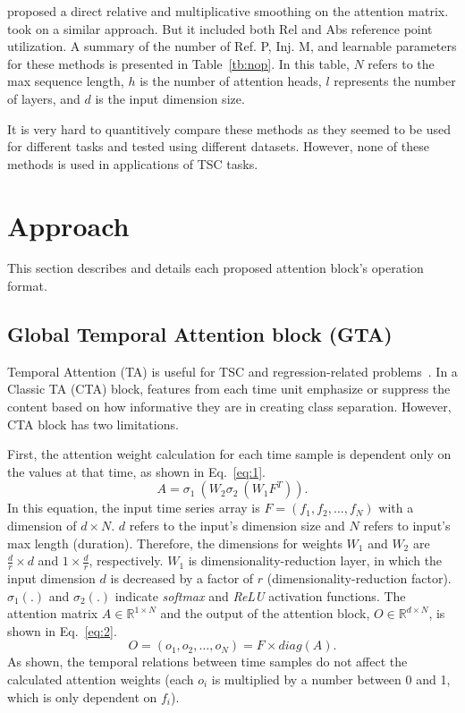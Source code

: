 \documentclass[journal]{IEEEtran}
\begin{document}
\cite{wu_da-transformer_2021} proposed a direct relative and multiplicative smoothing on the attention matrix.~\cite{huang-etal-2020-improve} took on a similar approach. But it included both Rel and Abs reference point utilization. A summary of the number of Ref. P, Inj. M, and learnable parameters for these methods is presented in Table~\ref{tb:nop}. In this table, $N$ refers to the max sequence length, $h$ is the number of attention heads, $l$ represents the number of layers, and $d$ is the input dimension size. 

It is very hard to quantitively compare these methods as they seemed to be used for different tasks and tested using different datasets. However, none of these methods is used in applications of TSC tasks. 

\section{Approach}
This section describes and details each proposed attention block's operation format.
\subsection{Global Temporal Attention block (GTA)}
Temporal Attention (TA) is useful for TSC and regression-related problems~\cite{doughty2019pros, zeng2020hybrid, xu2019learning}. In a Classic TA (CTA) block, features from each time unit emphasize or suppress the content based on how informative they are in creating class separation. However, CTA block has two limitations. 

First, the attention weight calculation for each time sample is dependent only on the values at that time, as shown in Eq.~\eqref{eq:1}.
\begin{equation} \label{eq:1}
A =\sigma_1\ (W_2\sigma_2\ (W_1F^T)).
\end{equation}
In this equation, the input time series array is $F=\left(f_1,f_2,\ldots,f_N\right)$ with a dimension of $d\times N$. $d$ refers to the input's dimension size and $N$ refers to input's max length (duration). Therefore, the dimensions for weights $W_1$ and $W_2$ are $\frac{d}{r}\times d$ and $1\times \frac{d}{r}$, respectively. $W_1$ is dimensionality-reduction layer, in which the input dimension $d$ is decreased by a factor of $r$ (dimensionality-reduction factor).
$ \sigma_1\left(.\right)$ and $ \sigma_2\left(.\right)$ indicate \textit{softmax} and \textit{ReLU} activation functions. The attention matrix $A \in \mathbb{R}^{1 \times N}$ and the output of the attention block, $O\in \mathbb{R}^{d \times N}$, is shown in Eq.~\eqref{eq:2}.\\
\begin{equation} \label{eq:2}
O =\left(o_1, o_2 ,\ldots, o_N\right)=F\times diag\left(A\right).
\end{equation}
As shown, the temporal relations between time samples do not affect the calculated attention weights (each $o_i$ is multiplied by a number between 0 and 1, which is only dependent on $f_i$).
\end{document}

